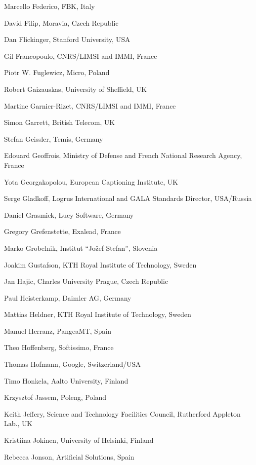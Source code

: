 \documentclass[10pt, plain]{../../metanetpaper}
\begin{document}
\begin{multicols}{3}
\begin{small}
\begin{enumerate}
{      \item Marcello Federico, FBK, Italy
      \item David Filip, Moravia, Czech Republic
      \item Dan Flickinger, Stanford University, USA
      \item Gil Francopoulo, CNRS/LIMSI and IMMI, France
      \item Piotr W. Fuglewicz, Micro, Poland
      \item Robert Gaizauskas, University of Sheffield, UK
      \item Martine Garnier-Rizet, CNRS/LIMSI and IMMI, France
      \item Simon Garrett, British Telecom, UK
      \item Stefan Geissler, Temis, Germany
      \item Edouard Geoffrois, Ministry of Defense and French National Research Agency, France
      \item Yota Georgakopolou, European Captioning Institute, UK
      \item Serge Gladkoff, Logrus International and GALA Standards Director, USA/Russia
      \item Daniel Grasmick, Lucy Software, Germany
      \item Gregory Grefenstette, Exalead, France
      \item Marko Grobelnik, Institut ``Jožef Stefan'', Slovenia
      \item Joakim Gustafson, KTH Royal Institute of Technology, Sweden
      \item Jan Hajic, Charles University Prague, Czech Republic
      \item Paul Heisterkamp, Daimler AG, Germany
      \item Mattias Heldner, KTH Royal Institute of Technology, Sweden
      \item Manuel Herranz, PangeaMT, Spain
      \item Theo Hoffenberg, Softissimo, France
      \item Thomas Hofmann, Google, Switzerland/USA
      \item Timo Honkela, Aalto University, Finland
      \item Krzysztof Jassem, Poleng, Poland
      \item Keith Jeffery, Science and Technology Facilities Council, Rutherford Appleton Lab., UK
      \item Kristiina Jokinen, University of Helsinki, Finland
      \item Rebecca Jonson, Artificial Solutions, Spain
}
\end{enumerate}
\end{small}
\end{multicols}
\end{document}
